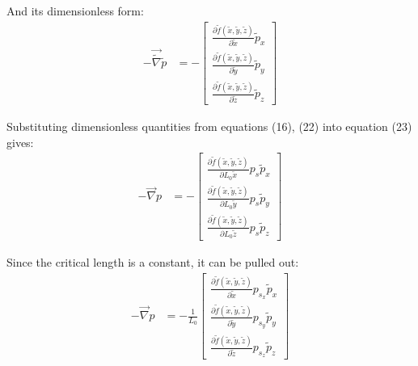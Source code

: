 \documentclass[titlepage]{article}
\begin{document}
    \noindent And its dimensionless form:  
    \begin{align}
        -\vec{\tilde{\nabla}}\tilde{p} &= -\begin{bmatrix}
            \displaystyle\frac{\partial{\tilde{f}\left(\tilde{x},\tilde{y},\tilde{z}\right)}}{\partial{\tilde{x}}}\tilde{p}_{x} \\[0.4cm]
            \displaystyle\frac{\partial{\tilde{f}\left(\tilde{x},\tilde{y},\tilde{z}\right)}}{\partial{\tilde{y}}}\tilde{p}_{y} \\[0.4cm]
            \displaystyle\frac{\partial{\tilde{f}\left(\tilde{x},\tilde{y},\tilde{z}\right)}}{\partial{\tilde{z}}}\tilde{p}_{z} 
        \end{bmatrix}
    \end{align}

    \noindent Substituting dimensionless quantities from equations (16), (22) into equation (23) gives: 
    \begin{align}
        -\vec{\nabla}p &= -\begin{bmatrix}
            \displaystyle\frac{\partial{\tilde{f}\left(\tilde{x},\tilde{y},\tilde{z}\right)}}{\partial{L_{0}\tilde{x}}}p_{s}\tilde{p}_{x} \\[0.4cm]
            \displaystyle\frac{\partial{\tilde{f}\left(\tilde{x},\tilde{y},\tilde{z}\right)}}{\partial{L_{0}\tilde{y}}}p_{s}\tilde{p}_{y} \\[0.4cm]
            \displaystyle\frac{\partial{\tilde{f}\left(\tilde{x},\tilde{y},\tilde{z}\right)}}{\partial{L_{0}\tilde{z}}}p_{s}\tilde{p}_{z} 
        \end{bmatrix}
    \end{align}



    \noindent Since the critical length is a constant, it can be pulled out: 
    \begin{align}
        -\vec{\nabla}p &= -\displaystyle\frac{1}{L_{0}}\begin{bmatrix}
            \displaystyle\frac{\partial{\tilde{f}\left(\tilde{x},\tilde{y},\tilde{z}\right)}}{\partial{\tilde{x}}}p_{s_{x}}\tilde{p}_{x} \\[0.4cm]
            \displaystyle\frac{\partial{\tilde{f}\left(\tilde{x},\tilde{y},\tilde{z}\right)}}{\partial{\tilde{y}}}p_{s_{y}}\tilde{p}_{y} \\[0.4cm]
            \displaystyle\frac{\partial{\tilde{f}\left(\tilde{x},\tilde{y},\tilde{z}\right)}}{\partial{\tilde{z}}}p_{s_{z}}\tilde{p}_{z} 
        \end{bmatrix}
    \end{align}
\end{document}
